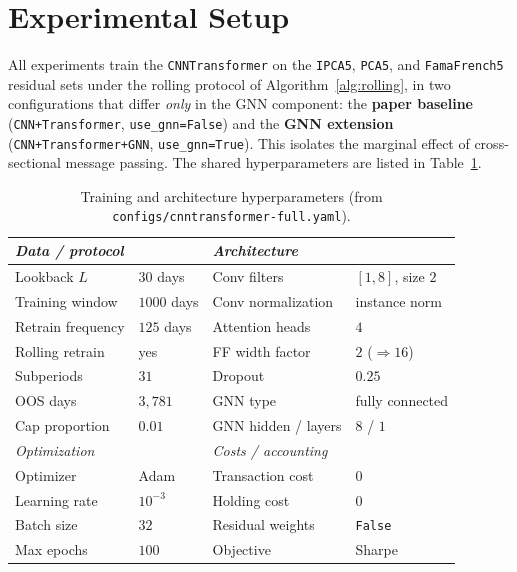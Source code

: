 \documentclass[11pt]{article}
\begin{document}
\section{Experimental Setup}
All experiments train the \texttt{CNNTransformer} on the \texttt{IPCA5},
\texttt{PCA5}, and \texttt{FamaFrench5} residual sets under the rolling protocol of
Algorithm~\ref{alg:rolling}, in two configurations that differ \emph{only} in the GNN component:
the \textbf{paper baseline} (\texttt{CNN+Transformer}, \texttt{use\_gnn=False}) and
the \textbf{GNN extension} (\texttt{CNN+Transformer+GNN}, \texttt{use\_gnn=True}).
This isolates the marginal effect of cross-sectional message passing. The shared
hyperparameters are listed in Table~\ref{tab:hparams}.

\begin{table}[H]
  \centering
  \caption{Training and architecture hyperparameters (from \texttt{configs/cnntransformer-full.yaml}).}
  \label{tab:hparams}
  \small
  \begin{tabular}{l l l l}
    \toprule
    \multicolumn{2}{l}{\textit{Data / protocol}} & \multicolumn{2}{l}{\textit{Architecture}} \\
    \midrule
    Lookback $L$            & $30$ days        & Conv filters         & $[1,8]$, size $2$ \\
    Training window         & $1000$ days      & Conv normalization   & instance norm \\
    Retrain frequency       & $125$ days       & Attention heads      & $4$ \\
    Rolling retrain         & yes              & FF width factor      & $2$ ($\Rightarrow 16$) \\
    Subperiods              & $31$             & Dropout              & $0.25$ \\
    OOS days                & $3{,}781$        & GNN type             & fully connected \\
    Cap proportion          & $0.01$           & GNN hidden / layers  & $8$ / $1$ \\
    \midrule
    \multicolumn{2}{l}{\textit{Optimization}} & \multicolumn{2}{l}{\textit{Costs / accounting}} \\
    \midrule
    Optimizer               & Adam             & Transaction cost     & $0$ \\
    Learning rate           & $10^{-3}$        & Holding cost         & $0$ \\
    Batch size              & $32$             & Residual weights     & \texttt{False} \\
    Max epochs              & $100$            & Objective            & Sharpe \\
    \bottomrule
  \end{tabular}
\end{table}
\end{document}
